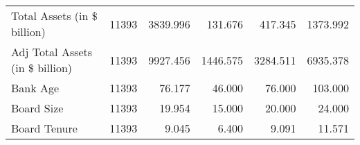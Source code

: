 \begin{longtable}{l*{1}{rrrrr}}
Total Assets (in \$ billion)&       11393&    3839.996&     131.676&     417.345&    1373.992\\
Adj Total Assets (in \$ billion)&       11393&    9927.456&    1446.575&    3284.511&    6935.378\\
Bank Age            &       11393&      76.177&      46.000&      76.000&     103.000\\
Board Size          &       11393&      19.954&      15.000&      20.000&      24.000\\
Board Tenure        &       11393&       9.045&       6.400&       9.091&      11.571\\
\bottomrule
\end{longtable}
